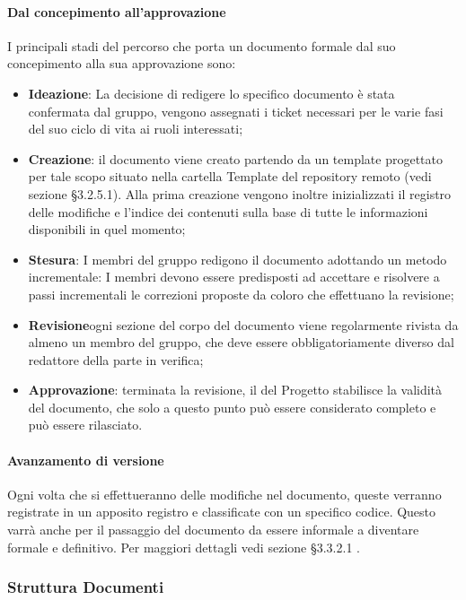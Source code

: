             \paragraph{Dal concepimento all’approvazione }
                I principali stadi del percorso che porta un documento formale dal suo concepimento alla sua approvazione sono:
                \begin{itemize}
                    \item\textbf{Ideazione}:  La decisione di redigere lo specifico documento è stata confermata dal gruppo, vengono assegnati i ticket necessari per le varie fasi del suo ciclo di vita ai ruoli interessati;
                    \item\textbf{Creazione}: il documento viene creato partendo da un template progettato per tale scopo situato nella cartella Template del repository remoto (vedi sezione §3.2.5.1). Alla prima creazione vengono inoltre inizializzati il registro delle modifiche e l’indice dei contenuti sulla base di tutte le informazioni disponibili in quel momento;
                    \item\textbf{Stesura}: I membri del gruppo redigono il documento adottando un metodo incrementale: I membri devono essere predisposti ad accettare e risolvere a passi incrementali le correzioni proposte da coloro che effettuano la revisione;
                    \item\textbf{Revisione}ogni sezione del corpo del documento viene regolarmente rivista da almeno un membro del gruppo, che deve essere obbligatoriamente diverso dal redattore della parte in verifica;
                    \item\textbf{Approvazione}: terminata la revisione, il  del Progetto stabilisce la validità del documento, che solo a questo punto può essere considerato completo e può essere rilasciato.
                \end{itemize}
            \paragraph{Avanzamento di versione}
                Ogni volta che si effettueranno delle modifiche nel documento, queste verranno registrate in un apposito registro e classificate con un specifico codice. Questo varrà anche per il passaggio del documento da essere informale a diventare formale e definitivo.
                Per maggiori dettagli vedi sezione §3.3.2.1 .


        \subsubsection{Struttura Documenti}
